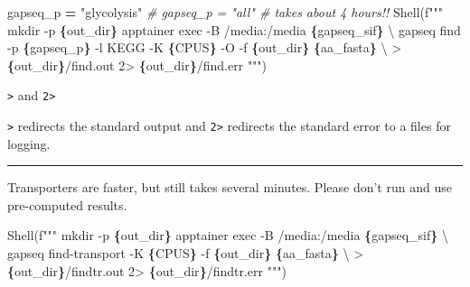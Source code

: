 \documentclass[
]{book}
\newenvironment{Shaded}{\begin{snugshade}}{\end{snugshade}}
\newcommand{\CharTok}[1]{\textcolor[rgb]{0.31,0.60,0.02}{#1}}
\newcommand{\CommentTok}[1]{\textcolor[rgb]{0.56,0.35,0.01}{\textit{#1}}}
\newcommand{\NormalTok}[1]{#1}
\newcommand{\OperatorTok}[1]{\textcolor[rgb]{0.81,0.36,0.00}{\textbf{#1}}}
\newcommand{\SpecialCharTok}[1]{\textcolor[rgb]{0.81,0.36,0.00}{\textbf{#1}}}
\newcommand{\SpecialStringTok}[1]{\textcolor[rgb]{0.31,0.60,0.02}{#1}}
\newcommand{\StringTok}[1]{\textcolor[rgb]{0.31,0.60,0.02}{#1}}
\begin{document}
\begin{Shaded}
\begin{Highlighting}[numbers=left,,]
\NormalTok{gapseq\_p }\OperatorTok{=} \StringTok{"glycolysis"}
\CommentTok{\# gapseq\_p = "all" \# takes about 4 hours!!}
\NormalTok{Shell(}\SpecialStringTok{f"""}
\SpecialStringTok{mkdir {-}p }\SpecialCharTok{\{}\NormalTok{out\_dir}\SpecialCharTok{\}}
\SpecialStringTok{apptainer exec {-}B /media:/media }\SpecialCharTok{\{}\NormalTok{gapseq\_sif}\SpecialCharTok{\}}\SpecialStringTok{ }\CharTok{\textbackslash{}}
\SpecialStringTok{    gapseq find {-}p }\SpecialCharTok{\{}\NormalTok{gapseq\_p}\SpecialCharTok{\}}\SpecialStringTok{ {-}l KEGG {-}K }\SpecialCharTok{\{}\NormalTok{CPUS}\SpecialCharTok{\}}\SpecialStringTok{ {-}O {-}f }\SpecialCharTok{\{}\NormalTok{out\_dir}\SpecialCharTok{\}}\SpecialStringTok{ }\SpecialCharTok{\{}\NormalTok{aa\_fasta}\SpecialCharTok{\}}\SpecialStringTok{ }\CharTok{\textbackslash{}}
\SpecialStringTok{        \textgreater{} }\SpecialCharTok{\{}\NormalTok{out\_dir}\SpecialCharTok{\}}\SpecialStringTok{/find.out 2\textgreater{} }\SpecialCharTok{\{}\NormalTok{out\_dir}\SpecialCharTok{\}}\SpecialStringTok{/find.err}
\SpecialStringTok{"""}\NormalTok{)}
\end{Highlighting}
\end{Shaded}

\texttt{\textgreater{}} and \texttt{2\textgreater{}}

\texttt{\textgreater{}} redirects the standard output and \texttt{2\textgreater{}} redirects the standard error to a files for logging.

\begin{center}\rule{0.5\linewidth}{0.5pt}\end{center}

Transporters are faster, but still takes several minutes. Please don't run and use pre-computed results.

\begin{Shaded}
\begin{Highlighting}[numbers=left,,]
\NormalTok{Shell(}\SpecialStringTok{f"""}
\SpecialStringTok{mkdir {-}p }\SpecialCharTok{\{}\NormalTok{out\_dir}\SpecialCharTok{\}}
\SpecialStringTok{apptainer exec {-}B /media:/media }\SpecialCharTok{\{}\NormalTok{gapseq\_sif}\SpecialCharTok{\}}\SpecialStringTok{ }\CharTok{\textbackslash{}}
\SpecialStringTok{    gapseq find{-}transport {-}K }\SpecialCharTok{\{}\NormalTok{CPUS}\SpecialCharTok{\}}\SpecialStringTok{ {-}f }\SpecialCharTok{\{}\NormalTok{out\_dir}\SpecialCharTok{\}}\SpecialStringTok{ }\SpecialCharTok{\{}\NormalTok{aa\_fasta}\SpecialCharTok{\}}\SpecialStringTok{ }\CharTok{\textbackslash{}}
\SpecialStringTok{        \textgreater{} }\SpecialCharTok{\{}\NormalTok{out\_dir}\SpecialCharTok{\}}\SpecialStringTok{/findtr.out 2\textgreater{} }\SpecialCharTok{\{}\NormalTok{out\_dir}\SpecialCharTok{\}}\SpecialStringTok{/findtr.err}
\SpecialStringTok{"""}\NormalTok{)}
\end{Highlighting}
\end{Shaded}
\end{document}
